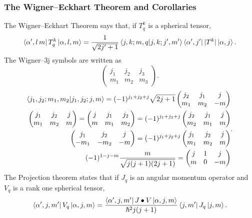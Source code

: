 \documentclass{article}
\begin{document}
    \subsubsection*{The Wigner--Eckhart Theorem and Corollaries}
      The Wigner--Eckhart Theorem says that, if $T_q^k$ is a spherical tensor,
      \[
        \bra{\alpha',l\,m}T_q^k\ket{\alpha ,l,m} = \frac{1}{\sqrt{2 j' + 1}}
      \bra{j,k;m,q}\ket{j,k;j',m'}\bra{\alpha',j'}|T^k|\ket{\alpha,j}
      .\] 
      The Wigner--3j symbols are written as 
      \[
      \begin{pmatrix}
        j_1 & j_2 & j_3 \\
        m_1 & m_2 & m_3
      \end{pmatrix}
      .\] 
      \[
        \begin{split}
          \bra{j_1,j_2;m_1,m_2}\ket{j_1,j_2;j,m} = (-1)^{j_1+j_2+j} \sqrt{2j+1}
          \begin{pmatrix}
            j_2 & j_1 & j \\
            m_1 & m_2 & -m
          \end{pmatrix} \\
          \begin{pmatrix}
            j_1 & j_2 & j \\
            m_1 & m_2 & m 
          \end{pmatrix} = 
          \begin{pmatrix}
            j & j_1 & j_2 \\
            m & m_1 & m_2 
          \end{pmatrix} = (-1)^{j_1 + j_2 + j} 
          \begin{pmatrix}
            j_2 & j_1 &j \\
            m_2 & m_1 & m
          \end{pmatrix} \\
          \begin{pmatrix}
            j_1 & j_2 & j \\
            -m_1 & -m_2 & -m 
          \end{pmatrix} = (-1)^{j_1 + j_2 + j}
          \begin{pmatrix}
            j_1 & j_2 & j \\
            m_1 & m_2 & m
          \end{pmatrix} \\
          (-1)^{1 - j - m}\frac{m}{\sqrt{j(j+1)(2j+1)}} = 
          \begin{pmatrix}
            j & 1 & j \\
            m & 0 & -m
          \end{pmatrix}
        \end{split}
      .\] 
      The Projection theorem states that if $J_q$ is an angular momentum 
      operator  and  $V_q$ is a rank one spherical tensor, 
      \[
        \bra{\alpha',j,m'}V_q\ket{\alpha,j,m} = 
        \frac{\bra{\alpha',j,m'}J\bullet V\ket{\alpha,j,m}}{\hbar^2 j(j+1)}
        \bra{j,m'}J_q\ket{j,m}
      .\] 
      
\end{document}
